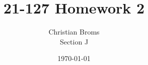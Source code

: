 \documentclass[12pt]{article}
\begin{document}
\title{21-127 Homework 2}
\author{Christian Broms \\ Section J}
\date{\today}
\maketitle
\end{document}
